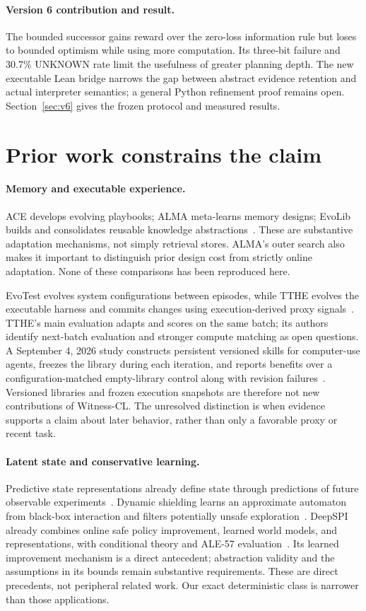 \documentclass[10pt,twocolumn]{article}
\begin{document}
\paragraph{Version 6 contribution and result.}
The bounded successor gains reward over the zero-loss information rule but
loses to bounded optimism while using more computation. Its three-bit failure
and 30.7\% UNKNOWN rate limit the usefulness of greater planning depth. The
new executable Lean bridge narrows the gap between abstract evidence retention
and actual interpreter semantics; a general Python refinement proof remains
open. Section~\ref{sec:v6} gives the frozen protocol and measured results.


\section{Prior work constrains the claim}
\paragraph{Memory and executable experience.}
ACE develops evolving playbooks; ALMA meta-learns memory designs; EvoLib builds
and consolidates reusable knowledge abstractions~\cite{ace,alma,evolib}. These are
substantive adaptation mechanisms, not simply retrieval stores. ALMA's outer
search also makes it important to distinguish prior design cost from strictly
online adaptation. None of these comparisons has been reproduced here.

EvoTest evolves system configurations between episodes, while TTHE evolves the
executable harness and commits changes using execution-derived proxy
signals~\cite{evotest,tthe}. TTHE's main evaluation adapts and scores
on the same batch; its authors identify next-batch evaluation and stronger
compute matching as open questions. A September 4, 2026 study constructs persistent
versioned skills for computer-use agents, freezes the library during each
iteration, and reports benefits over a configuration-matched empty-library
control along with revision failures~\cite{persistent}. Versioned libraries and
frozen execution snapshots are therefore not new contributions of Witness-CL.
The unresolved distinction is when evidence supports a claim about later
behavior, rather than only a favorable proxy or recent task.

\paragraph{Latent state and conservative learning.}
Predictive state representations already define state through predictions of
future observable experiments~\cite{psr}. Dynamic shielding learns an approximate
automaton from black-box interaction and filters potentially unsafe
exploration~\cite{dynamicshield}. DeepSPI already combines online safe policy
improvement, learned world models, and representations, with conditional theory
and ALE-57 evaluation~\cite{deepspi}. Its learned improvement mechanism is a
direct antecedent; abstraction validity and the assumptions in its bounds
remain substantive requirements. These are direct precedents, not peripheral
related work. Our exact deterministic class is narrower than those applications.
\end{document}
